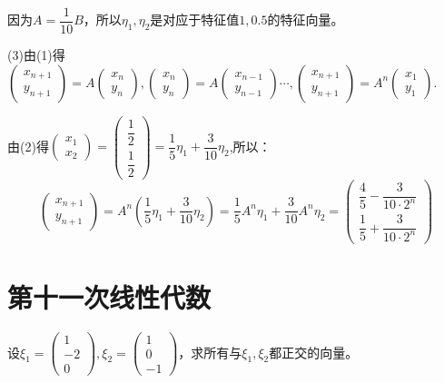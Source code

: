 \documentclass[a4paper]{report}
\begin{document}
\begin{jie}
因为$A=\dfrac{1}{10}B$，所以$\eta_1,\eta_2$是对应于特征值$1,0.5$的特征向量。

(3)由(1)得$
\begin{pmatrix}
x_{n+1}\\ y_{n+1}
\end{pmatrix}=A
\begin{pmatrix}
x_n\\ y_n
\end{pmatrix}
,\begin{pmatrix}
x_n\\ y_n
\end{pmatrix}
=A\begin{pmatrix}
x_{n-1}\\ y_{n-1}
\end{pmatrix}\cdots,\begin{pmatrix}
x_{n+1}\\ y_{n+1}
\end{pmatrix}=A^n
\begin{pmatrix}
x_1\\ y_1
\end{pmatrix}$.

由(2)得$
\begin{pmatrix}
 x_1\\ x_2
\end{pmatrix}=\begin{pmatrix}
               \dfrac{1}{2}\\[4pt]\dfrac{1}{2}
              \end{pmatrix}=\dfrac{1}{5}\eta_1+\dfrac{3}{10}\eta_2
$,所以：
\begin{equation*}
\begin{pmatrix}
x_{n+1}\\ y_{n+1}
\end{pmatrix}=A^n\left(\dfrac{1}{5}\eta_1+\dfrac{3}{10}\eta_2\right)=\dfrac{1}{5}A^{n}\eta_1+\dfrac{3}{10}A^{n}\eta_2=
\begin{pmatrix}
\dfrac{4}{5}-\dfrac{3}{10\cdot 2^n}\\[4pt]\dfrac{1}{5}+\dfrac{3}{10\cdot 2^n}
\end{pmatrix}
\end{equation*}
\end{jie}

\clearpage
\section{第十一次线性代数}
\EX 设$\xi_1=
\begin{pmatrix}
1\\ -2\\0
\end{pmatrix},\xi_2=
\begin{pmatrix}
1\\ 0\\-1
\end{pmatrix}
$，求所有与$\xi_1,\xi_2$都正交的向量。
\end{document}
